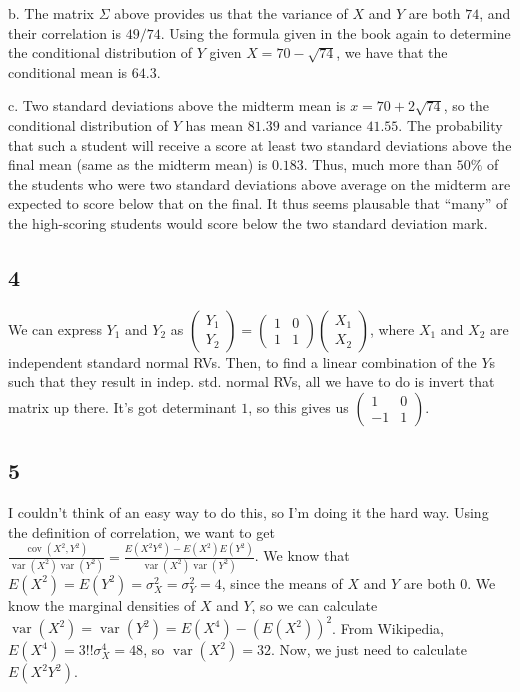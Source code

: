 \documentclass{article}
\newcommand{\openm}{\begin{pmatrix}}
\newcommand{\closem}{\end{pmatrix}}
\DeclareMathOperator{\cov}{cov}
\DeclareMathOperator{\var}{var}
\begin{document}
b. The matrix $\Sigma$ above provides us that the variance of $X$ and $Y$ are both $74$, and their correlation is $49/74$. Using the formula given in the book again to determine the conditional distribution of $Y$ given $X=70-\sqrt{74}$, we have that the conditional mean is $64.3$.

c. Two standard deviations above the midterm mean is $x=70+2\sqrt{74}$, so the conditional distribution of $Y$ has mean $81.39$ and variance $41.55$. The probability that such a student will receive a score at least two standard deviations above the final mean (same as the midterm mean) is $0.183$. Thus, much more than $50\%$ of the students who were two standard deviations above average on the midterm are expected to score below that on the final. It thus seems plausable that ``many'' of the high-scoring students would score below the two standard deviation mark.
\subsection*{4}
We can express $Y_1$ and $Y_2$ as $\openm Y_1\\Y_2\closem=\openm1&0\\1&1\closem\openm X_1\\X_2\closem$, where $X_1$ and $X_2$ are independent standard normal RVs. Then, to find a linear combination of the $Y$s such that they result in indep. std. normal RVs, all we have to do is invert that matrix up there. It's got determinant $1$, so this gives us $\openm 1&0\\-1&1\closem$.
\subsection*{5}
I couldn't think of an easy way to do this, so I'm doing it the hard way. Using the definition of correlation, we want to get $\frac{\cov(X^2,Y^2)}{\var(X^2)\var(Y^2)}=\frac{E(X^2Y^2)-E(X^2)E(Y^2)}{\var(X^2)\var(Y^2)}$. We know that $E(X^2)=E(Y^2)=\sigma^2_X=\sigma^2_Y=4$, since the means of $X$ and $Y$ are both $0$. We know the marginal densities of $X$ and $Y$, so we can calculate $\var(X^2)=\var(Y^2)=E(X^4)-(E(X^2))^2$. From Wikipedia, $E(X^4)=3!!\sigma_X^4=48$, so $\var(X^2)=32$. Now, we just need to calculate $E(X^2Y^2)$.
\end{document}
